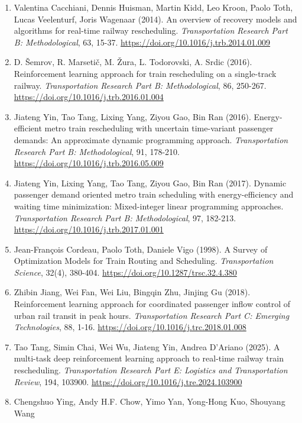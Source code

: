 \documentclass[
]{article}
\begin{document}
\begin{enumerate}
\def\labelenumi{\arabic{enumi}.}
\item
  Valentina Cacchiani, Dennis Huisman, Martin Kidd, Leo Kroon, Paolo
  Toth, Lucas Veelenturf, Joris Wagenaar (2014). An overview of recovery
  models and algorithms for real-time railway rescheduling.
  \emph{Transportation Research Part B: Methodological}, 63, 15-37.
  \url{https://doi.org/10.1016/j.trb.2014.01.009}
\item
  D. Šemrov, R. Marsetič, M. Žura, L. Todorovski, A. Srdic (2016).
  Reinforcement learning approach for train rescheduling on a
  single-track railway. \emph{Transportation Research Part B:
  Methodological}, 86, 250-267.
  \url{https://doi.org/10.1016/j.trb.2016.01.004}
\item
  Jiateng Yin, Tao Tang, Lixing Yang, Ziyou Gao, Bin Ran (2016).
  Energy-efficient metro train rescheduling with uncertain time-variant
  passenger demands: An approximate dynamic programming approach.
  \emph{Transportation Research Part B: Methodological}, 91, 178-210.
  \url{https://doi.org/10.1016/j.trb.2016.05.009}
\item
  Jiateng Yin, Lixing Yang, Tao Tang, Ziyou Gao, Bin Ran (2017). Dynamic
  passenger demand oriented metro train scheduling with
  energy-efficiency and waiting time minimization: Mixed-integer linear
  programming approaches. \emph{Transportation Research Part B:
  Methodological}, 97, 182-213.
  \url{https://doi.org/10.1016/j.trb.2017.01.001}
\item
  Jean-François Cordeau, Paolo Toth, Daniele Vigo (1998). A Survey of
  Optimization Models for Train Routing and Scheduling.
  \emph{Transportation Science}, 32(4), 380-404.
  \url{https://doi.org/10.1287/trsc.32.4.380}
\item
  Zhibin Jiang, Wei Fan, Wei Liu, Bingqin Zhu, Jinjing Gu (2018).
  Reinforcement learning approach for coordinated passenger inflow
  control of urban rail transit in peak hours. \emph{Transportation
  Research Part C: Emerging Technologies}, 88, 1-16.
  \url{https://doi.org/10.1016/j.trc.2018.01.008}
\item
  Tao Tang, Simin Chai, Wei Wu, Jiateng Yin, Andrea D'Ariano (2025). A
  multi-task deep reinforcement learning approach to real-time railway
  train rescheduling. \emph{Transportation Research Part E: Logistics
  and Transportation Review}, 194, 103900.
  \url{https://doi.org/10.1016/j.tre.2024.103900}
\item
  Chengshuo Ying, Andy H.F. Chow, Yimo Yan, Yong-Hong Kuo, Shouyang Wang

\end{enumerate}
\end{document}
